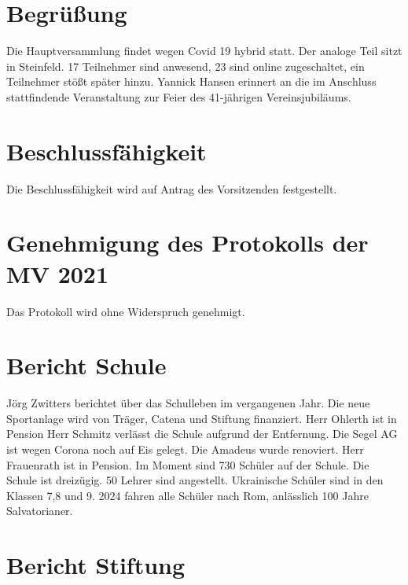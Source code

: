 \documentclass[a4paper, 11pt]{article}
\begin{document}
\newpage

\section*{Begrüßung}

Die Hauptversammlung findet wegen Covid 19 hybrid statt. Der analoge Teil sitzt in Steinfeld.
17 Teilnehmer sind anwesend, 23 sind online zugeschaltet, ein Teilnehmer stößt später hinzu.
Yannick Hansen erinnert an die im Anschluss stattfindende Veranstaltung zur Feier des 41-jährigen Vereinsjubiläums.



\section*{Beschlussfähigkeit}

Die Beschlussfähigkeit wird auf Antrag des Vorsitzenden festgestellt.

\section*{Genehmigung des Protokolls der MV 2021}

Das Protokoll wird ohne Widerspruch genehmigt.

\section*{Bericht Schule}

Jörg Zwitters berichtet über das Schulleben im vergangenen Jahr.
Die neue Sportanlage wird von Träger, Catena und Stiftung finanziert.
Herr Ohlerth ist in Pension
Herr Schmitz verlässt die Schule aufgrund der Entfernung.
Die Segel AG ist wegen Corona noch auf Eis gelegt. Die Amadeus wurde renoviert.
Herr Frauenrath ist in Pension.
Im Moment sind 730 Schüler auf der Schule. Die Schule ist dreizügig. 50 Lehrer sind angestellt.
Ukrainische Schüler sind in den Klassen 7,8 und 9.
2024 fahren alle Schüler nach Rom, anlässlich 100 Jahre Salvatorianer.

\section*{Bericht Stiftung}
\end{document}
